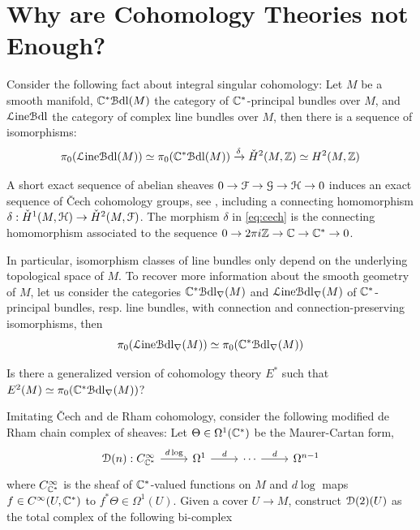 \documentclass[10pt]{amsart}
\begin{document}
\section{Why are Cohomology Theories not Enough?}
Consider the following fact about integral singular cohomology: Let $M$ be a smooth manifold, $\mathbb{C}^*\mathcal{B}\mathrm{dl}(M)$ the category of $\mathbb{C}^*$-principal bundles over $M$, and $\mathcal{L}\mathrm{ine}\mathcal{B}\mathrm{dl}$ the category of complex line bundles over $M$, then there is a sequence of isomorphisms:
\begin{equation}\label{eq:cech}
	\pi_0(\mathcal{L}\mathrm{ine}\mathcal{B}\mathrm{dl}(M))\simeq\pi_0(\mathbb{C}^*\mathcal{B}\mathrm{dl}(M))\xrightarrow{\delta}\check{H}^2(M,\mathbb{Z})\simeq H^2(M,\mathbb{Z})
\end{equation}
\begin{remark}
	A short exact sequence of abelian sheaves $0\to\mathcal{F}\to\mathcal{G}\to\mathcal{H}\to 0$ induces an exact sequence of \v Cech cohomology groups, see \cite{project2026cechsing}, including a connecting homomorphism $\delta:\check{H}^1(M,\mathcal{H})\to\check{H}^2(M,\mathcal{F})$. The morphism $\delta$ in \cref{eq:cech} is the connecting homomorphism associated to the sequence $0\to2\pi i\mathbb{Z}\to\mathbb{C}\to\mathbb{C}^*\to0$. 
\end{remark}
In particular, isomorphism classes of line bundles only depend on the underlying topological space of $M$. To recover more information about the smooth geometry of $M$, let us consider the categories $\mathbb{C}^*\mathcal{B}\mathrm{dl}_\nabla(M)$ and $\mathcal{L}\mathrm{ine}\mathcal{B}\mathrm{dl}_\nabla(M)$ of $\mathbb{C}^*$-principal bundles, resp. line bundles, with connection and connection-preserving isomorphisms, then 
\[\pi_0(\mathcal{L}\mathrm{ine}\mathcal{B}\mathrm{dl}_\nabla(M))\simeq\pi_0(\mathbb{C}^*\mathcal{B}\mathrm{dl}_\nabla(M))\]
\begin{question}
Is there a generalized version of cohomology theory $E^*$ such that $E^2(M)\simeq\pi_0(\mathbb{C}^*\mathcal{B}\mathrm{dl}_\nabla(M))$? 
\end{question}
Imitating \v Cech and de Rham cohomology, consider the following modified de Rham chain complex of sheaves: Let $\Theta\in\Omega^1(\mathbb{C}^*)$ be the Maurer-Cartan form, 
\begin{equation}\label{eq:delignecomp}
	\begin{tikzcd}
		\lD(n):C^\infty_{\bC^*}\arrow[r," d\log"] & \Omega^1 \arrow[r," d"] & \cdots \arrow[r," d"] & \Omega^{n-1}
	\end{tikzcd}
\end{equation}where $C^\infty_{\mathbb{C}^*}$ is the sheaf of $\mathbb{C}^*$-valued functions on $M$ and $ d\log$ maps $f\in C^{\infty}(U,\mathbb{C}^*)$ to $f^*\Theta\in\Omega^1(U)$. Given a cover $U\to M$, construct $\mathcal{D}(2)(U)$ as the total complex of the following bi-complex 
\end{document}
